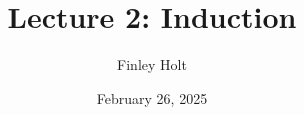 \documentclass[11pt]{article}
\theoremstyle{definition}
\begin{document}
\title{Lecture 2: Induction}
\author{Finley Holt}
\date{February 26, 2025}
\maketitle
\end{document}

